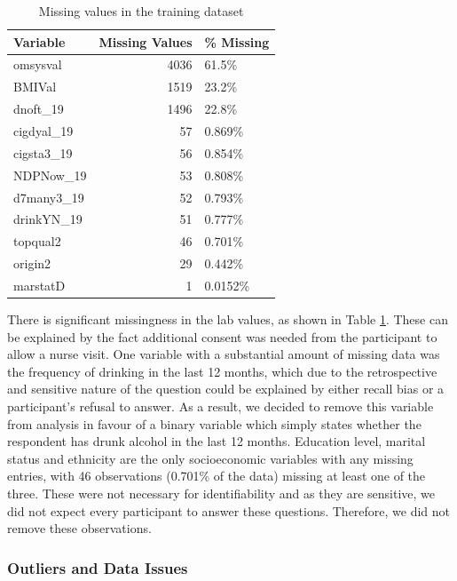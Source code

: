 \documentclass[
  11pt,
  twocolumn]{article}
\begin{document}
\begin{table}
\centering
\caption{\label{tab:outputnatable}Missing values in the training dataset\label{tab:output-na-table}}
\centering
\fontsize{9}{11}\selectfont
\begin{tabular}[t]{l|r|l}
\hline
\textbf{Variable} & \textbf{Missing Values} & \textbf{\% Missing}\\
\hline
omsysval & 4036 & 61.5\%\\
\hline
BMIVal & 1519 & 23.2\%\\
\hline
dnoft\_19 & 1496 & 22.8\%\\
\hline
cigdyal\_19 & 57 & 0.869\%\\
\hline
cigsta3\_19 & 56 & 0.854\%\\
\hline
NDPNow\_19 & 53 & 0.808\%\\
\hline
d7many3\_19 & 52 & 0.793\%\\
\hline
drinkYN\_19 & 51 & 0.777\%\\
\hline
topqual2 & 46 & 0.701\%\\
\hline
origin2 & 29 & 0.442\%\\
\hline
marstatD & 1 & 0.0152\%\\
\hline
\end{tabular}
\end{table}

There is significant missingness in the lab values, as shown in Table
\ref{tab:output-na-table}. These can be explained by the fact additional
consent was needed from the participant to allow a nurse visit. One
variable with a substantial amount of missing data was the frequency of
drinking in the last 12 months, which due to the retrospective and
sensitive nature of the question could be explained by either recall
bias or a participant's refusal to answer. As a result, we decided to
remove this variable from analysis in favour of a binary variable which
simply states whether the respondent has drunk alcohol in the last 12
months. Education level, marital status and ethnicity are the only
socioeconomic variables with any missing entries, with 46 observations
(0.701\% of the data) missing at least one of the three. These were not
necessary for identifiability and as they are sensitive, we did not
expect every participant to answer these questions. Therefore, we did
not remove these observations.

\subsubsection{Outliers and Data Issues}\label{outliers-and-data-issues}
\end{document}
